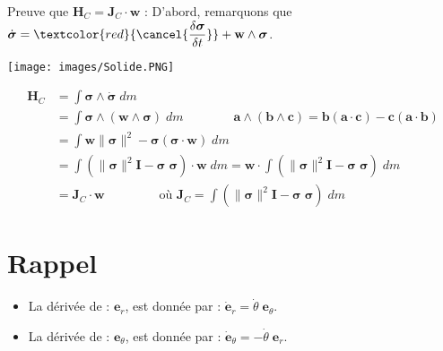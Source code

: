 \documentclass[a4paper]{article}
\begin{document}
Preuve que $ \textbf{H}_C = \textbf{J}_C \cdot \textbf{w} $ : 
D'abord, remarquons que $\displaystyle \dot{\boldsymbol{\sigma}} = \textcolor{red}{\cancel{\frac{\delta \boldsymbol{\sigma}}{\delta t}}} + \textbf{w} \wedge \boldsymbol{\sigma} $.
\begin{center} \texttt{[image: images/Solide.PNG]} \end{center}
\begin{align*}
\textbf{H}_C &= \int \boldsymbol{\sigma} \wedge \dot{\boldsymbol{\sigma}} \; d m \\
&= \int \boldsymbol{\sigma} \wedge ( \textbf{w} \wedge \boldsymbol{\sigma} ) \; d m \qquad \qquad \textbf{a} \wedge (\textbf{b} \wedge \textbf{c}) = \textbf{b} (\textbf{a} \cdot \textbf{c}) - \textbf{c} (\textbf{a} \cdot \textbf{b}) \\
&= \int \textbf{w} \| \boldsymbol{\sigma} \|^2 - \boldsymbol{\sigma} (\boldsymbol{\sigma} \cdot \textbf{w}) \; d m \\
&= \int ( \| \boldsymbol{\sigma} \|^2 \textbf{I} - \boldsymbol{\sigma} \; \boldsymbol{\sigma} ) \cdot \textbf{w} \; d m = \textbf{w} \cdot \int ( \| \boldsymbol{\sigma} \|^2 \textbf{I} - \boldsymbol{\sigma} \; \boldsymbol{\sigma} ) \; d m \\
&= \textbf{J}_C \cdot \textbf{w} \qquad \qquad \text{ où } \textbf{J}_C = \int ( \| \boldsymbol{\sigma} \|^2 \textbf{I} - \boldsymbol{\sigma} \; \boldsymbol{\sigma} ) \; d m
\end{align*}











\section{Rappel}





\begin{itemize}

\item La dérivée de : $ \textbf{e}_r $, est donnée par : $ \dot{\textbf{e}}_r = \dot{\theta} \; \textbf{e}_\theta $.

\item La dérivée de : $ \textbf{e}_\theta $, est donnée par : $ \dot{\textbf{e}}_\theta = - \dot{\theta} \; \textbf{e}_r $.

\end{itemize}
\end{document}
